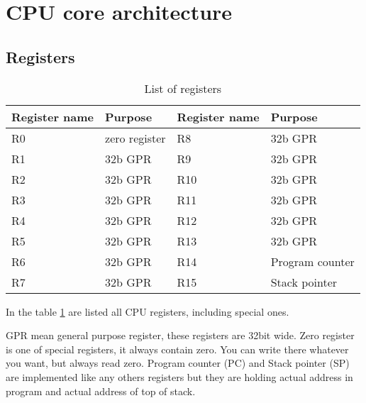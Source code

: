 \section{CPU core architecture}

\subsection{Registers}

\begin{table}[h]
    \centering
    \begin{tabular}{|l|l|l|l|}
        \hline
        \textbf{Register name} & \textbf{Purpose} & \textbf{Register name} & \textbf{Purpose} \\ \hline
        R0                     & zero register    & R8                     & 32b GPR          \\ \hline
        R1                     & 32b GPR          & R9                     & 32b GPR          \\ \hline
        R2                     & 32b GPR          & R10                    & 32b GPR          \\ \hline
        R3                     & 32b GPR          & R11                    & 32b GPR          \\ \hline
        R4                     & 32b GPR          & R12                    & 32b GPR          \\ \hline
        R5                     & 32b GPR          & R13                    & 32b GPR          \\ \hline
        R6                     & 32b GPR          & R14                    & Program counter  \\ \hline
        R7                     & 32b GPR          & R15                    & Stack pointer    \\ \hline
    \end{tabular}
    \caption{List of registers}
    \label{tab:registers_list}
\end{table}

In the table \ref{tab:registers_list} are listed all CPU registers, including
special ones.

GPR mean general purpose register, these registers are 32bit wide.
Zero register is one of special registers, it always contain zero.
You can write there whatever you want, but always read zero. Program
counter (PC) and Stack pointer (SP) are implemented like any others
registers but they are holding actual address in program and actual
address of top of stack.

